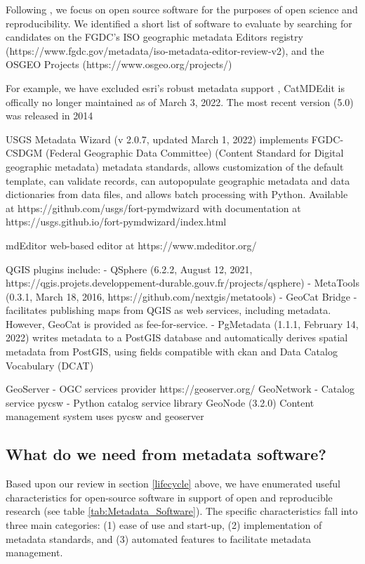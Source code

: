 \documentclass{isprs} %
\begin{document}
Following \citet{Singleton2016}, we focus on open source software for the purposes of open science and reproducibility.
We identified a short list of software to evaluate by searching for candidates on the FGDC's ISO geographic metadata Editors registry (https://www.fgdc.gov/metadata/iso-metadata-editor-review-v2), and the OSGEO Projects (https://www.osgeo.org/projects/)


For example, we have excluded esri's robust metadata support , CatMDEdit is offically no longer maintained as of March 3, 2022. The most recent version (5.0) was released in 2014



USGS Metadata Wizard (v 2.0.7, updated March 1, 2022) implements FGDC-CSDGM (Federal Geographic Data Committee) (Content Standard for Digital geographic metadata) metadata standards, allows customization of the default template, can validate records, can autopopulate geographic metadata and data dictionaries from data files, and allows batch processing with Python. Available at https://github.com/usgs/fort-pymdwizard with documentation at https://usgs.github.io/fort-pymdwizard/index.html

mdEditor web-based editor at https://www.mdeditor.org/ 

QGIS plugins include:
- QSphere (6.2.2, August 12, 2021, https://qgis.projets.developpement-durable.gouv.fr/projects/qsphere)
- MetaTools (0.3.1, March 18, 2016, https://github.com/nextgis/metatools)
- GeoCat Bridge - facilitates publishing maps from QGIS as web services, including metadata. However, GeoCat is provided as fee-for-service.
- PgMetadata (1.1.1, February 14, 2022) writes metadata to a PostGIS database and automatically derives spatial metadata from PostGIS, using fields compatible with ckan and Data Catalog Vocabulary (DCAT)

GeoServer - OGC services provider https://geoserver.org/ 
GeoNetwork - Catalog service
pycsw - Python catalog service library
GeoNode (3.2.0) Content management system uses pycsw and geoserver


\subsection{What do we need from metadata software?}\label{metadataneeds}

Based upon our review in section \ref{lifecycle} above, we have enumerated useful characteristics for open-source software in support of open and reproducible research (see table \ref{tab:Metadata_Software}).
The specific characteristics fall into three main categories: (1) ease of use and start-up, (2) implementation of metadata standards, and (3) automated features to facilitate metadata management.
\end{document}
